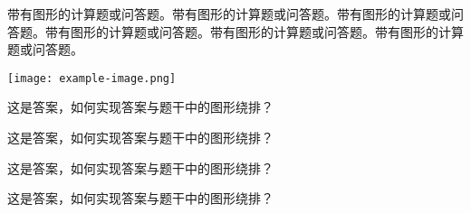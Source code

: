 \documentclass{exam-zh}
\begin{document}
\begin{question}
    带有图形的计算题或问答题。带有图形的计算题或问答题。带有图形的计算题或问答题。带有图形的计算题或问答题。带有图形的计算题或问答题。带有图形的计算题或问答题。


\end{question}
  \begin{flushright}
	\texttt{[image: example-image.png]}
  \end{flushright}
\begin{solution}
    这是答案，如何实现答案与题干中的图形绕排？

    这是答案，如何实现答案与题干中的图形绕排？

    这是答案，如何实现答案与题干中的图形绕排？

    这是答案，如何实现答案与题干中的图形绕排？
\end{solution}
\end{document}
